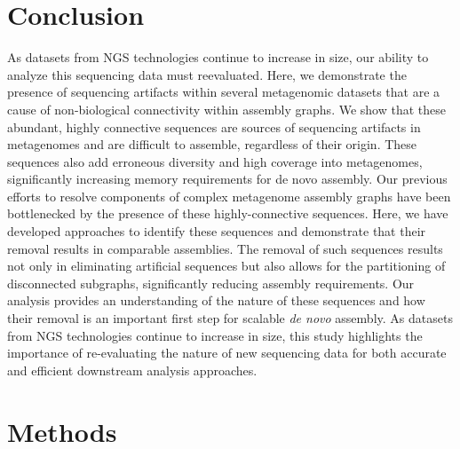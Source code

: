 \documentclass[10pt]{article}
\begin{document}
\section*{Conclusion}

As datasets from NGS technologies continue to increase in size, our ability to analyze this sequencing data must reevaluated.  Here, we demonstrate the presence of sequencing artifacts within several metagenomic datasets that are a cause of non-biological connectivity within assembly graphs.  We show that these abundant, highly connective sequences are sources of sequencing artifacts in metagenomes and are difficult to assemble, regardless of their origin.  These sequences also add erroneous diversity and high coverage into metagenomes, significantly increasing memory requirements for de novo assembly.  Our previous efforts to resolve components of complex metagenome assembly graphs have been bottlenecked by the presence of these highly-connective sequences.  Here, we have developed approaches to identify these sequences and demonstrate that their removal results in comparable assemblies.  The removal of such sequences results not only in eliminating artificial sequences but also allows for the partitioning of disconnected subgraphs, significantly reducing assembly requirements.  Our analysis provides an understanding of the nature of these sequences and how their removal is an important first step for scalable \emph{de novo} assembly.  As datasets from NGS technologies continue to increase in size, this study highlights the importance of re-evaluating the nature of new sequencing data for both accurate and efficient downstream analysis approaches. 

\section*{Methods}
\end{document}
